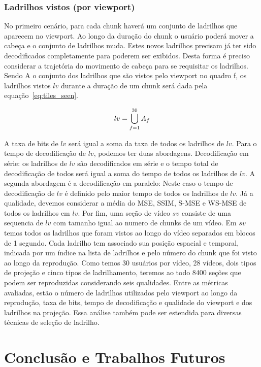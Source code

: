 \subsection{Ladrilhos vistos (por viewport)}

No primeiro cenário, para cada chunk haverá um conjunto de ladrilhos que aparecem no viewport. Ao longo da duração do chunk o usuário poderá mover a cabeça e o conjunto de ladrilhos muda. Estes novos ladrilhos precisam já ter sido decodificados completamente para poderem ser exibidos. Desta forma é preciso considerar a trajetória do movimento de cabeça para se requisitar os ladrilhos. Sendo A o conjunto dos ladrilhos que são vistos pelo viewport no quadro f, os ladrilhos vistos $lv$ durante a duração de um chunk será dada pela equação~\ref{eq:tiles_seen}.

\begin{equation}
        lv=\bigcup^{30}_{f=1} A_f \\
        \label{eq:tiles_seen}
\end{equation}

A taxa de bits de $lv$ será igual a soma da taxa de todos os ladrilhos de $lv$. Para o tempo de decodificação de $lv$, podemos ter duas abordagens. Decodificação em série: os ladrilhos de $lv$ são decodificados em série e o tempo total de decodificação de todos será igual a soma do tempo de todos os ladrilhos de $lv$. A segunda abordagem é a decodificação em paralelo: Neste caso o tempo de decodificação de $lv$ é definido pelo maior tempo de todos os ladrilhos de $lv$. Já a qualidade, devemos considerar a média do MSE, SSIM, S-MSE e WS-MSE de todos os ladrilhos em $lv$. Por fim, uma seção de vídeo $sv$ consiste de uma sequencia de $lv$ com tamanho igual ao numero de chunks de um vídeo. Em $sv$ temos todos os ladrilhos que foram vistos ao longo do vídeo separados em blocos de 1 segundo. Cada ladrilho tem associado sua posição espacial e temporal, indicada por um índice na lista de ladrilhos e pelo número do chunk que foi visto ao longo da reprodução. Como temos 30 usuários por vídeo, 28 vídeos, dois tipos de projeção e cinco tipos de ladrilhamento, teremos ao todo 8400 seções que podem ser reproduzidas considerando seis qualidades. Entre as métricas avaliadas, estão o número de ladrilhos utilizados pelo viewport ao longo da reprodução, taxa de bits, tempo de decodificação e qualidade do viewport e dos ladrilhos na projeção. Essa análise também pode ser estendida para diversas técnicas de seleção de ladrilho.


\chapter{Conclusão e Trabalhos Futuros}\label{Cap:Conclusion}

